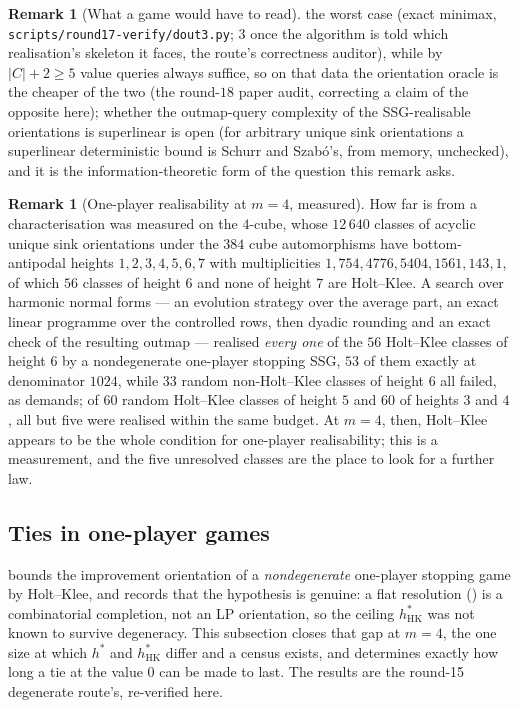 \documentclass[11pt]{article}
\theoremstyle{plain}
\theoremstyle{definition}
\newtheorem{remark}[theorem]{Remark}
\begin{document}
\begin{remark}[What a game would have to read]
the worst case (exact minimax, \texttt{scripts/round17-verify/dout3.py};
$3$ once the algorithm is told which realisation's skeleton it faces, the
route's correctness auditor), while by  $|C|+2\ge5$
value queries always suffice, so on that data the orientation oracle is the
cheaper of the two (the round-$18$ paper audit, correcting a claim of the
opposite here); whether
the outmap-query complexity of the SSG-realisable orientations is
superlinear is open (for arbitrary unique sink orientations a
superlinear deterministic bound is Schurr and Szab\'o's, from memory,
unchecked), and it is the information-theoretic form of the question
this remark asks.
\end{remark}

\begin{remark}[One-player realisability at $m=4$, measured]\label{rem:hk-survey}
How far  is from a characterisation was measured
on the $4$-cube, whose $12\,640$ classes of acyclic unique sink
orientations under the $384$ cube automorphisms have bottom-antipodal
heights $1,2,3,4,5,6,7$ with multiplicities
$1,754,4776,5404,1561,143,1$, of which $56$ classes of height $6$ and
none of height $7$ are Holt--Klee. A search over harmonic normal forms
--- an evolution strategy over the average part, an exact linear
programme over the controlled rows, then dyadic rounding and an exact
check of the resulting outmap --- realised \emph{every one} of the $56$
Holt--Klee classes of height $6$ by a nondegenerate one-player stopping
SSG, $53$ of them exactly at denominator $1024$, while $33$ random
non-Holt--Klee classes of height $6$ all failed, as
 demands; of $60$ random Holt--Klee classes of
height $5$ and $60$ of heights $3$ and $4$, all but five were realised
within the same budget. At $m=4$, then, Holt--Klee appears to be the
whole condition for one-player realisability; this is a measurement, and
the five unresolved classes are the place to look for a further law.
\end{remark}

\subsection{Ties in one-player games}\label{sec:ties}

 bounds the improvement orientation of a
\emph{nondegenerate} one-player stopping game by Holt--Klee, and
 records that the hypothesis is genuine: a flat
resolution () is a combinatorial completion,
not an LP orientation, so the ceiling $h^{\ast}_{\mathrm{HK}}$ was not
known to survive degeneracy. This subsection closes that gap at $m=4$,
the one size at which $h^{\ast}$ and $h^{\ast}_{\mathrm{HK}}$ differ and
a census exists, and determines exactly how long a tie at the value $0$
can be made to last. The results are the round-15 degenerate route's,
re-verified here.
\end{document}
